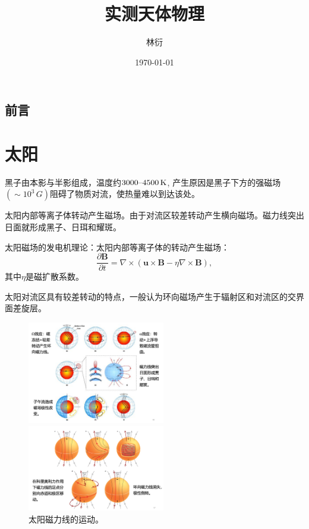 \documentclass[11pt, a4paper, oneside, onecolumn]{ctexart}
\title{实测天体物理}
\author{林衍}
\date{\today}
\numberwithin{equation}{subsection}
\begin{document}
\maketitle
\subsection*{前言}


\newpage
\tableofcontents

\newpage
\section{太阳}
黑子由本影与半影组成，温度约$3000\text{\textendash}4500\,\unit{K}$, 产生原因是黑子下方的强磁场$\left(\sim10^{3}\,\unit{G}\right)$阻碍了物质对流，使热量难以到达该处。

太阳内部等离子体转动产生磁场。由于对流区较差转动产生横向磁场。磁力线突出日面就形成黑子、日珥和耀斑。

太阳磁场的发电机理论：太阳内部等离子体的转动产生磁场：
\begin{equation}
\frac{\partial{}\boldsymbol{B}}{\partial{}t}=\nabla\times\left(\boldsymbol{u}\times\boldsymbol{B}-\eta\nabla\times\boldsymbol{B}\right),
\end{equation}
其中$\eta$是磁扩散系数。

太阳对流区具有较差转动的特点，一般认为环向磁场产生于辐射区和对流区的交界面差旋层。
\begin{figure}[!htbp]
\centering
\begin{minipage}[t]{0.45\textwidth}
\includegraphics[width=6cm]{figures/figure1_1.png}
\end{minipage}
\begin{minipage}[t]{0.45\textwidth}
\includegraphics[width=6cm]{figures/figure1_2.png}
\end{minipage}
\captionsetup{justification=raggedright, singlelinecheck=false}
\caption{太阳磁力线的运动。}
\label{太阳磁力线的运动。}
\end{figure}
\end{document}

